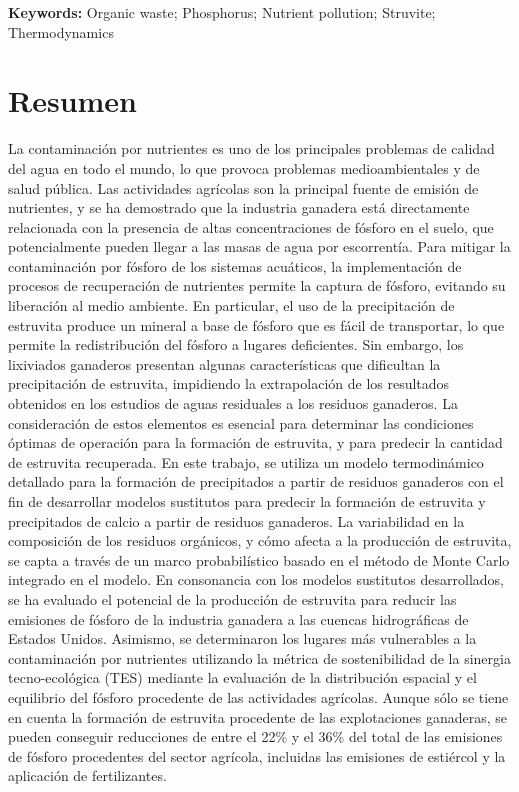 \textbf{Keywords:} Organic waste; Phosphorus; Nutrient pollution; Struvite; Thermodynamics

\newpage

\section*{Resumen}
La contaminación por nutrientes es uno de los principales problemas de calidad del agua en todo el mundo, lo que provoca problemas medioambientales y de salud pública. Las actividades agrícolas son la principal fuente de emisión de nutrientes, y se ha demostrado que la industria ganadera está directamente relacionada con la presencia de altas concentraciones de fósforo en el suelo, que potencialmente pueden llegar a las masas de agua por escorrentía. Para mitigar la contaminación por fósforo de los sistemas acuáticos, la implementación de procesos de recuperación de nutrientes permite la captura de fósforo, evitando su liberación al medio ambiente. En particular, el uso de la precipitación de estruvita produce un mineral a base de fósforo que es fácil de transportar, lo que permite la redistribución del fósforo a lugares deficientes. Sin embargo, los lixiviados ganaderos presentan algunas características que dificultan la precipitación de estruvita, impidiendo la extrapolación de los resultados obtenidos en los estudios de aguas residuales a los residuos ganaderos. La consideración de estos elementos es esencial para determinar las condiciones óptimas de operación para la formación de estruvita, y para predecir la cantidad de estruvita recuperada. En este trabajo, se utiliza un modelo termodinámico detallado para la formación de precipitados a partir de residuos ganaderos con el fin de desarrollar modelos sustitutos para predecir la formación de estruvita y precipitados de calcio a partir de residuos ganaderos. La variabilidad en la composición de los residuos orgánicos, y cómo afecta a la producción de estruvita, se capta a través de un marco probabilístico basado en el método de Monte Carlo integrado en el modelo. En consonancia con los modelos sustitutos desarrollados, se ha evaluado el potencial de la producción de estruvita para reducir las emisiones de fósforo de la industria ganadera a las cuencas hidrográficas de Estados Unidos. Asimismo, se determinaron los lugares más vulnerables a la contaminación por nutrientes utilizando la métrica de sostenibilidad de la sinergia tecno-ecológica (TES) mediante la evaluación de la distribución espacial y el equilibrio del fósforo procedente de las actividades agrícolas. Aunque sólo se tiene en cuenta la formación de estruvita procedente de las explotaciones ganaderas, se pueden conseguir reducciones de entre el 22\% y el 36\% del total de las emisiones de fósforo procedentes del sector agrícola, incluidas las emisiones de estiércol y la aplicación de fertilizantes.

